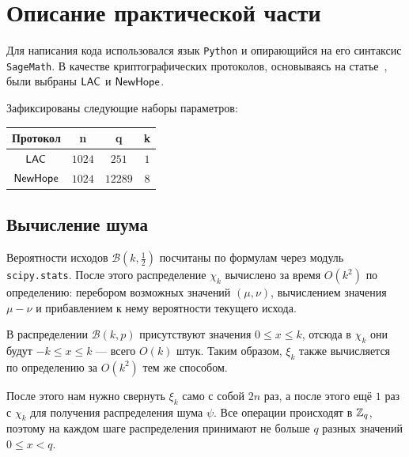 \section{Описание практической части}
\label{sec:Chapter5} 


Для написания кода использовался язык \texttt{Python} и опирающийся на его синтаксис 
\texttt{SageMath}. В качестве криптографических протоколов, основываясь на статье~\cite{RLWE_Channel}, были выбраны $\mathsf{LAC}$ и $\mathsf{NewHope}$.

Зафиксированы следующие наборы параметров:
\begin{table}[h]
	\centering
	\begin{tabular}{|c|c|c|c|}
		\hline Протокол & n & q & k \\ \hline
		$\mathsf{LAC}$ & $1024$ & $251$ & $1$ \\ \hline
		$\mathsf{NewHope}$ & $1024$ & $12289$ & $8$ \\ \hline
	\end{tabular}
\end{table}

\vspace{-0.5cm}
\subsection{Вычисление шума}

Вероятности исходов $\mathcal{B}(k, \frac12)$ посчитаны по формулам через модуль \texttt{scipy.stats}. После этого распределение $\chi_k$ вычислено за время $O(k^2)$ по определению: перебором возможных значений $(\mu, \nu)$, вычислением значения $\mu-\nu$ и прибавлением к нему вероятности текущего исхода.

В распределении $\mathcal{B}(k, p)$ присутствуют значения $0 \leq x \leq k$, отсюда в $\chi_k$ они будут $-k \leq x \leq k$ --- всего $O(k)$ штук. Таким образом, $\xi_k$ также вычисляется по определению за $O(k^2)$ тем же способом.

После этого нам нужно свернуть $\xi_k$ само с собой $2n$ раз, а после этого ещё $1$ раз с $\chi_k$ для получения распределения шума $\psi$. Все операции происходят в $\mathbb{Z}_q$, поэтому на каждом шаге распределения принимают не больше $q$ разных значений $0 \leq x < q$.

